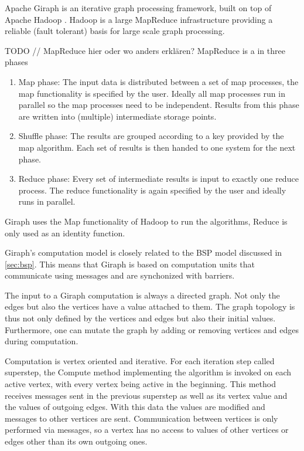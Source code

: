 

Apache Giraph is an iterative graph processing framework, built on top of Apache Hadoop \cite{Giraph}. Hadoop is a large MapReduce infrastructure providing a reliable (fault tolerant) basis for large scale graph processing.

TODO // MapReduce hier oder wo anders erklären?
MapReduce is a in three phases
\begin{enumerate}
	\item Map phase: The input data is distributed between a set of map processes, the map functionality is specified by the user. Ideally all map processes run in parallel so the map processes need to be independent. Results from this phase are written into (multiple) intermediate storage points.
	\item Shuffle phase: The results are grouped according to a key provided by the map algorithm. Each set of results is then handed to one system for the next phase.
	\item Reduce phase: Every set of intermediate results is input to exactly one reduce process. The reduce functionality is again specified by the user and ideally runs in parallel.
\end{enumerate}
Giraph uses the Map functionality of Hadoop to run the algorithms, Reduce is only used as an identity function.

Giraph's computation model is closely related to the BSP model discussed in \autoref{sec:bsp}. This means that Giraph is based on computation units that communicate using messages and are synchonized with barriers.

The input to a Giraph computation is always a directed graph. Not only the edges but also the vertices have a value attached to them. The graph topology is thus not only defined by the vertices and edges but also their initial values.
Furthermore, one can mutate the graph by adding or removing vertices and edges during computation.

Computation is vertex oriented and iterative.
For each iteration step called superstep, the Compute method implementing the algorithm is invoked on each active vertex, with every vertex being active in the beginning.
This method receives messages sent in the previous superstep as well as its vertex value and the values of outgoing edges.
With this data the values are modified and messages to other vertices are sent.
Communication between vertices is only performed via messages, so a vertex has no access to values of other vertices or edges other than its own outgoing ones.

